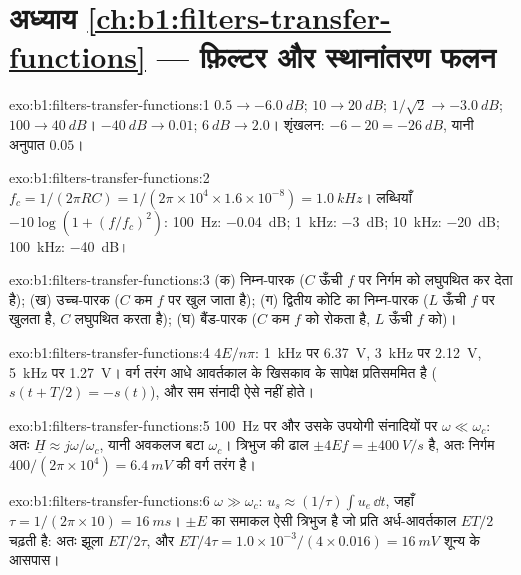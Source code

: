 \section*{अध्याय \ref{ch:b1:filters-transfer-functions} --- फ़िल्टर और स्थानांतरण फलन}

\begin{solution}{exo:b1:filters-transfer-functions:1}
$0.5 \to \qty{-6.0}{dB}$; $10 \to \qty{20}{dB}$; $1/\sqrt2 \to \qty{-3.0}{dB}$;
$100 \to \qty{40}{dB}$। $\qty{-40}{dB} \to 0.01$; $\qty{+6}{dB} \to 2.0$।
शृंखलन: $-6 - 20 = \qty{-26}{dB}$, यानी अनुपात $0.05$।
\end{solution}

\begin{solution}{exo:b1:filters-transfer-functions:2}
$f_c = 1/(2\pi RC) = 1/(2\pi \times 10^4 \times 1.6\times10^{-8}) =
\qty{1.0}{kHz}$। लब्धियाँ $-10\log(1 + (f/f_c)^2)$: \qty{100}{Hz}:
\qty{-0.04}{dB}; \qty{1}{kHz}: \qty{-3}{dB}; \qty{10}{kHz}: \qty{-20}{dB};
\qty{100}{kHz}: \qty{-40}{dB}।
\end{solution}

\begin{solution}{exo:b1:filters-transfer-functions:3}
(क) निम्न-पारक ($C$ ऊँची $f$ पर निर्गम को लघुपथित कर देता है); (ख) उच्च-पारक
($C$ कम $f$ पर खुल जाता है); (ग) द्वितीय कोटि का निम्न-पारक ($L$ ऊँची $f$ पर
खुलता है, $C$ लघुपथित करता है); (घ) बैंड-पारक ($C$ कम $f$ को रोकता है, $L$ ऊँची $f$ को)।
\end{solution}

\begin{solution}{exo:b1:filters-transfer-functions:4}
$4E/n\pi$: \qty{1}{kHz} पर \qty{6.37}{V}, \qty{3}{kHz} पर \qty{2.12}{V},
\qty{5}{kHz} पर \qty{1.27}{V}। वर्ग तरंग आधे आवर्तकाल के खिसकाव के
सापेक्ष प्रतिसममित है ($s(t + T/2) = -s(t)$), और सम संनादी ऐसे
नहीं होते।
\end{solution}

\begin{solution}{exo:b1:filters-transfer-functions:5}
\qty{100}{Hz} पर और उसके उपयोगी संनादियों पर $\omega \ll \omega_c$:
अतः $\underline H \approx j\omega/\omega_c$, यानी अवकलज बटा
$\omega_c$। त्रिभुज की ढाल $\pm 4Ef = \pm\qty{400}{V/s}$ है, अतः
निर्गम  $400/(2\pi \times 10^4) =
\qty{6.4}{mV}$ की वर्ग तरंग है।
\end{solution}

\begin{solution}{exo:b1:filters-transfer-functions:6}
$\omega \gg \omega_c$: $u_s \approx (1/\tau)\int u_e\,\dd t$, जहाँ $\tau =
1/(2\pi \times 10) = \qty{16}{ms}$। $\pm E$ का समाकल ऐसी
त्रिभुज है जो प्रति अर्ध-आवर्तकाल $ET/2$ चढ़ती है: अतः झूला $ET/2\tau$, और 
$ET/4\tau = 1.0 \times 10^{-3}/(4 \times 0.016) = \qty{16}{mV}$ शून्य के
आसपास।
\end{solution}

